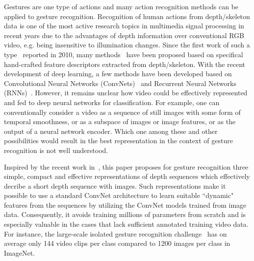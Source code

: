 \documentclass[10pt, a4paper, conference]{IEEEtran}
\begin{document}
Gestures are one type of actions and many action recognition methods can be applied to gesture recognition. Recognition of human actions from depth/skeleton data is one of the most active research topics in multimedia signal processing in recent years due to the advantages of depth information over conventional RGB video, e.g. being insensitive to illumination changes. Since the first work of such a type~\cite{li2010action} reported in 2010, many methods~\cite{wang2012mining,Yang2012a,Oreifej2013,Gowayyed2013_HOD,yangsuper,rahmani2014hopc,
pichao2014,lurange,escalante2015principal,Vemulapallia2016,zhang2016rgb} have been proposed based on specifical hand-crafted feature descriptors extracted from depth/skeleton. With the recent development of deep learning, a few methods have been developed based on Convolutional Neural Networks (ConvNets)~\cite{pichao2015,pichaoTHMS,pichao2016,pichaoicprwa,pichaocsvt2016} and Recurrent Neural Networks (RNNs)~\cite{du2015hierarchical,veeriah2015differential,zhu2015co,shahroudy2016ntu}.  However, it remains unclear how video could be effectively represented and fed to deep neural networks for classification. For example, one can conventionally consider a video as a sequence of still images with some form of temporal smoothness, or as a subspace of images or image features, or as the output of a neural network encoder. Which one among these and other possibilities would result in the best representation in the context of gesture recognition is not well understood. 


Inspired by the recent work in~\cite{pichao2015,pichaoTHMS,pichao2016,bilen2016dynamic}, this paper proposes for gesture recognition three simple, compact and effective representations of depth sequences which effectively decribe a short depth sequence with images. Such representations make it possible to use a standard ConvNet architecture to learn suitable ``dynamic" features from the sequences by utilizing the ConvNet models trained from image data. Consequently, it avoids training millions of parameters from scratch and is especially valuable in the cases that lack sufficient annotated training video data. For instance, the large-scale isolated gesture recognition challenge~\cite{wanchalearn} has on average only 144 video clips per class compared to 1200 images per class in ImageNet.
\end{document}
